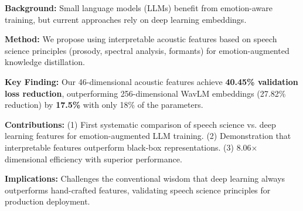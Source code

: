 
\textbf{Background:} Small language models (LLMs) benefit from emotion-aware training, but current approaches rely on deep learning embeddings.

\textbf{Method:} We propose using interpretable acoustic features based on speech science principles (prosody, spectral analysis, formants) for emotion-augmented knowledge distillation.

\textbf{Key Finding:} Our 46-dimensional acoustic features achieve \textbf{40.45\% validation loss reduction}, outperforming 256-dimensional WavLM embeddings (27.82\% reduction) by \textbf{17.5\%} with only 18\% of the parameters.

\textbf{Contributions:}
(1) First systematic comparison of speech science vs. deep learning features for emotion-augmented LLM training.
(2) Demonstration that interpretable features outperform black-box representations.
(3) 8.06$\times$ dimensional efficiency with superior performance.

\textbf{Implications:} Challenges the conventional wisdom that deep learning always outperforms hand-crafted features, validating speech science principles for production deployment.
